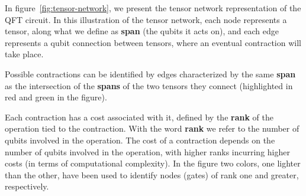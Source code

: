 \documentclass[12pt,oneside,a4paper]{article}
\begin{document}

In figure~\ref{fig:tensor-network}, we present the tensor network representation of the QFT circuit. In this illustration of the tensor network, each node represents a tensor, along what we define as \textbf{span} (the qubits it acts on), and each edge represents a qubit connection between tensors, where an eventual contraction will take place.

Possible contractions can be identified by edges characterized by the same \textbf{span} as the intersection of the \textbf{spans} of the two tensors they connect (highlighted in red and green in the figure).

Each contraction has a cost associated with it, defined by the \textbf{rank} of the operation tied to the contraction. With the word \textbf{rank} we refer to the number of qubits involved in the operation. The cost of a contraction depends on the number of qubits involved in the operation, with higher ranks incurring higher costs (in terms of computational complexity). In the figure two colors, one lighter than the other, have been used to identify nodes (gates) of rank one and greater, respectively.
\end{document}
